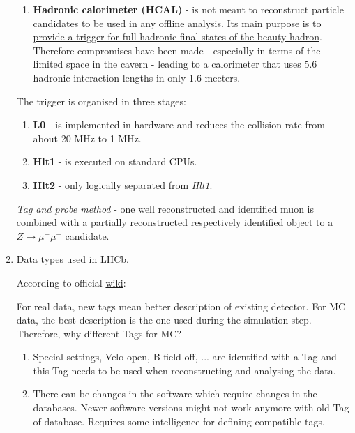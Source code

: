 \documentclass[11pt,a4paper,twoside]{article}
\begin{document}
\begin{enumerate}
\begin{enumerate}
            \item \textbf{Hadronic calorimeter (HCAL)} - is not meant to reconstruct particle candidates to be used in any offline analysis. Its main purpose is to \underline{provide a trigger for full hadronic final states of the beauty hadron}. Therefore compromises have been made - especially in terms of the limited space in the cavern - leading to a calorimeter that uses 5.6 hadronic interaction lengths in only 1.6 meeters.
        \end{enumerate}

        The trigger is organised in three stages:
        \begin{enumerate}
            \item \textbf{L0} - is implemented in hardware and reduces the collision rate from about 20 MHz to 1 MHz.
            \item \textbf{Hlt1} - is executed on standard CPUs.
            \item \textbf{Hlt2} - only logically separated from \textit{Hlt1}. 
        \end{enumerate}


        \textit{Tag and probe method} - one well reconstructed and identified muon is combined with a partially reconstructed respectively identified object to a $Z \longrightarrow \mu^{+} \mu^{-}$ candidate.


        \item Data types used in LHCb.

        According to official \hyperlink{https://twiki.cern.ch/twiki/bin/view/LHCb/RecommendedTags}{wiki}:

        For real data, new tags mean better description of existing detector. For MC data, the best description is the one used during the simulation step. Therefore, why different Tags for MC?

        \begin{enumerate}
            \item Special settings, Velo open, B field off, ... are identified with a Tag and this Tag needs to be used when reconstructing and analysing the data.
            \item There can be changes in the software which require changes in the databases. Newer software versions might not work anymore with old Tag of database. Requires some intelligence for defining compatible tags.
        \end{enumerate}



\end{enumerate}
\end{document}
